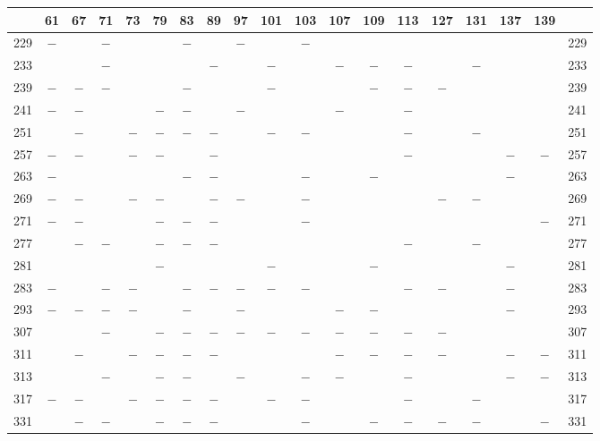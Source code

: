 \begin{center}\begingroup\fontsize{8}{10.5}\selectfont\setlength{\tabcolsep}{2pt}
\begin{tabular}{r|c|c|c|c|c|c|c|c|c|c|c|c|c|c|c|c|c|r}
\hline
 & 61 & 67 & 71 & 73 & 79 & 83 & 89 & 97 & 101 & 103 & 107 & 109 & 113 & 127 & 131 & 137 & 139 & \\
\hline
229 & $-$ &  & $-$ &  &  & $-$ &  & $-$ &  & $-$ &  &  &  &  &  &  &  & 229\\
233 &  &  & $-$ &  &  &  & $-$ &  & $-$ &  & $-$ & $-$ & $-$ &  & $-$ &  &  & 233\\
239 & $-$ & $-$ & $-$ &  &  & $-$ &  &  & $-$ &  &  & $-$ & $-$ & $-$ &  &  &  & 239\\
241 & $-$ & $-$ &  &  & $-$ & $-$ &  & $-$ &  &  & $-$ &  & $-$ &  &  &  &  & 241\\
251 &  & $-$ &  & $-$ & $-$ & $-$ & $-$ &  & $-$ & $-$ &  &  & $-$ &  & $-$ &  &  & 251\\
257 & $-$ & $-$ &  & $-$ & $-$ &  & $-$ &  &  &  &  &  & $-$ &  &  & $-$ & $-$ & 257\\
263 & $-$ &  &  &  &  & $-$ & $-$ &  &  & $-$ &  & $-$ &  &  &  & $-$ &  & 263\\
269 & $-$ & $-$ &  & $-$ & $-$ &  & $-$ & $-$ &  & $-$ &  &  &  & $-$ & $-$ &  &  & 269\\
271 & $-$ & $-$ &  &  & $-$ & $-$ & $-$ &  &  & $-$ &  &  &  &  &  &  & $-$ & 271\\
277 &  & $-$ & $-$ &  & $-$ & $-$ & $-$ &  &  &  &  &  & $-$ &  & $-$ &  &  & 277\\
281 &  &  &  &  & $-$ &  &  &  & $-$ &  &  & $-$ &  &  &  & $-$ &  & 281\\
283 & $-$ &  & $-$ & $-$ &  & $-$ & $-$ & $-$ & $-$ & $-$ &  &  & $-$ & $-$ &  & $-$ &  & 283\\
293 & $-$ & $-$ & $-$ & $-$ &  & $-$ &  & $-$ &  &  & $-$ & $-$ &  &  &  & $-$ &  & 293\\
307 &  &  & $-$ &  & $-$ & $-$ & $-$ & $-$ & $-$ & $-$ & $-$ & $-$ & $-$ & $-$ &  &  &  & 307\\
311 &  & $-$ &  & $-$ & $-$ & $-$ & $-$ &  &  &  & $-$ & $-$ & $-$ & $-$ &  & $-$ & $-$ & 311\\
313 &  &  & $-$ &  & $-$ & $-$ &  & $-$ &  & $-$ & $-$ &  & $-$ &  &  & $-$ & $-$ & 313\\
317 & $-$ & $-$ &  & $-$ & $-$ & $-$ & $-$ &  & $-$ & $-$ &  &  & $-$ &  & $-$ &  &  & 317\\
331 &  & $-$ & $-$ &  & $-$ & $-$ & $-$ &  &  & $-$ &  & $-$ & $-$ & $-$ & $-$ &  & $-$ & 331\\

\end{tabular}
\end{center}
